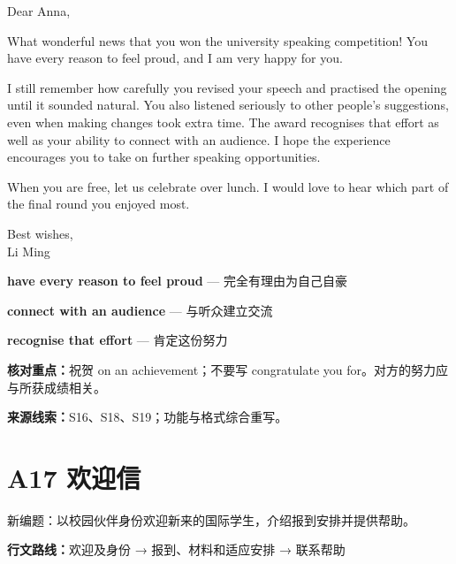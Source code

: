\documentclass[11pt,a4paper,fontset=macnew]{ctexart}
\newenvironment{example}{\begingroup\fontsize{11}{14.3}\selectfont\setlength{\parskip}{4pt}}{\par\endgroup}
\begin{document}
\begin{example}
\noindent Dear Anna,\par
What wonderful news that you won the university speaking competition! You have every reason to feel proud, and I am very happy for you.

I still remember how carefully you revised your speech and practised the opening until it sounded natural. You also listened seriously to other people's suggestions, even when making changes took extra time. The award recognises that effort as well as your ability to connect with an audience. I hope the experience encourages you to take on further speaking opportunities.

When you are free, let us celebrate over lunch. I would love to hear which part of the final round you enjoyed most.

\noindent Best wishes,\\Li Ming\par
\end{example}
\par\vspace{4pt}{\bfseries 好词好句：优先记这三处}\par\nopagebreak
{\small\textbf{have every reason to feel proud} — 完全有理由为自己自豪}\par
{\small\textbf{connect with an audience} — 与听众建立交流}\par
{\small\textbf{recognise that effort} — 肯定这份努力}\par
{\small\textbf{核对重点：}祝贺 on an achievement；不要写 congratulate you for。对方的努力应与所获成绩相关。}\par
{\fontsize{8}{10}\selectfont\textbf{来源线索：}S16、S18、S19；功能与格式综合重写。}\par
\clearpage\section*{A17  欢迎信}
{\small 新编题：以校园伙伴身份欢迎新来的国际学生，介绍报到安排并提供帮助。}\par
{\small\textbf{行文路线：}欢迎及身份 → 报到、材料和适应安排 → 联系帮助}\par
\par\vspace{4pt}{\bfseries 可替换模板}\par\nopagebreak
\end{document}
